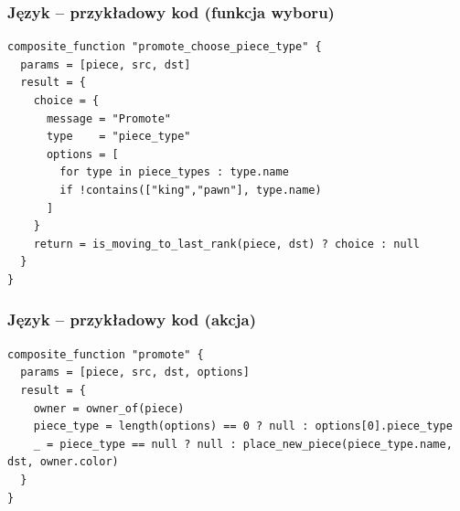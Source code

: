\documentclass{beamer}
\begin{document}
\begin{frame}[fragile]
	\frametitle{Język -- przykładowy kod (funkcja wyboru)}
    \begin{lstlisting}
composite_function "promote_choose_piece_type" {
  params = [piece, src, dst]
  result = {
    choice = {
      message = "Promote"
      type    = "piece_type"
      options = [
        for type in piece_types : type.name
        if !contains(["king","pawn"], type.name)
      ]
    }
    return = is_moving_to_last_rank(piece, dst) ? choice : null
  }
}
	\end{lstlisting}
\end{frame}

\begin{frame}[fragile]
	\frametitle{Język -- przykładowy kod (akcja)}
	\begin{lstlisting}
composite_function "promote" {
  params = [piece, src, dst, options]
  result = {
    owner = owner_of(piece)
    piece_type = length(options) == 0 ? null : options[0].piece_type
    _ = piece_type == null ? null : place_new_piece(piece_type.name, dst, owner.color)
  }
}
	\end{lstlisting}
\end{frame}

\end{document}
